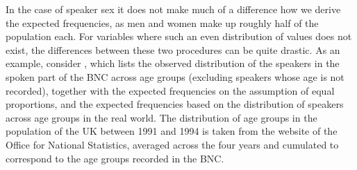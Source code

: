 In the case of speaker sex it does not make much of a difference how we derive the expected  frequencies, as men and women make up roughly half of the population each. For variables where such an even distribution  of values does not exist, the differences between these two procedures can be quite drastic. As an example, consider , which lists the observed distribution of the speakers in the spoken  part of the BNC  across age  groups (excluding speakers whose age  is not recorded), together with the expected  frequencies on the assumption of equal proportions, and the expected frequencies based on the distribution  of speakers across age  groups in the real world. The distribution of age  groups in the population of the UK between 1991 and 1994 is taken from the website of the Office for National Statistics, averaged across the four years and cumulated to correspond to the age  groups recorded in the  BNC.\largerpage

\begin{table}
\caption{Observed and expected frequencies of Speaker Age in the BNC}
\label{tab:speakerageobsex}
\end{table}

